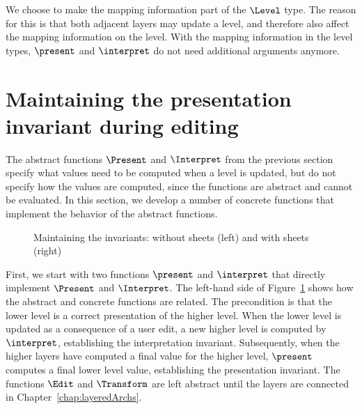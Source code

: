 

We choose to make the mapping information part of the $\Level$ type. The reason for this is that both adjacent layers may update a level, and therefore also affect the mapping information on the level.  With the mapping information in the level types, $\present$ and $\interpret$ do not need additional arguments anymore.
\ec



%																
%																
%																
\section{Maintaining the presentation invariant during editing}   \label{sect:maintainingInv}

The abstract functions $\Present$ and $\Interpret$ from the previous section specify what values need to be computed when a level is updated, but do not specify how the values are computed, since the functions are abstract and cannot be evaluated. In this section, we develop a number of concrete  functions that implement the behavior of the abstract functions.

\begin{figure}
\begin{center}
\begin{center}
 
\end{center}
\caption{Maintaining the invariants: without sheets (left) and with sheets (right)}\label{maintainingInvs} 
\end{center}
\end{figure}

First, we start with two functions $\present$ and $\interpret$ that directly implement $\Present$ and $\Interpret$. The left-hand side of Figure~\ref{maintainingInvs} shows how the abstract and concrete functions are related. The precondition is that the lower level is a correct presentation of the higher level. When the lower level is updated as a consequence of a user edit, a new higher level is computed by $\interpret$, establishing the interpretation invariant. Subsequently, when the higher layers have computed a final value for the higher level, $\present$ computes a final lower level value, establishing the presentation invariant. The functions $\Edit$ and $\Transform$ are left abstract until the layers are connected in Chapter~\ref{chap:layeredArchs}.

